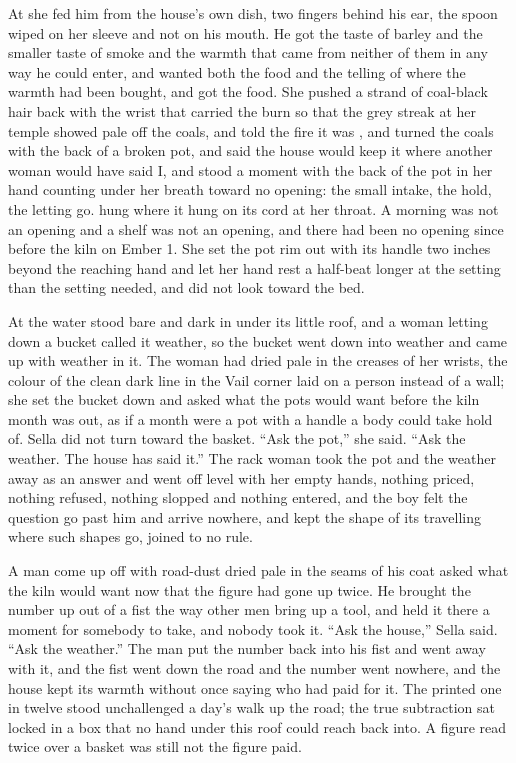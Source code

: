 At  she fed him from the house's own dish, two fingers behind his ear, the spoon wiped on her sleeve and not on his mouth. He got the taste of barley and the smaller taste of smoke and the warmth that came from neither of them in any way he could enter, and wanted both the food and the telling of where the warmth had been bought, and got the food. She pushed a strand of coal-black hair back with the wrist that carried the burn so that the grey streak at her temple showed pale off the coals, and told the fire it was , and turned the coals with the back of a broken pot, and said the house would keep it where another woman would have said I, and stood a moment with the back of the pot in her hand counting under her breath toward no opening: the small intake, the hold, the letting go.  hung where it hung on its cord at her throat. A morning was not an opening and a shelf was not an opening, and there had been no opening since before the kiln on Ember 1. She set the pot rim out with its handle two inches beyond the reaching hand and let her hand rest a half-beat longer at the setting than the setting needed, and did not look toward the bed.

\scenebreak

At  the water stood bare and dark in  under its little roof, and a woman letting down a bucket called it weather, so the bucket went down into weather and came up with weather in it. The woman had  dried pale in the creases of her wrists, the colour of the clean dark line in the Vail corner laid on a person instead of a wall; she set the bucket down and asked what the pots would want before the kiln month was out, as if a month were a pot with a handle a body could take hold of. Sella did not turn toward the basket. “Ask the pot,” she said. “Ask the weather. The house has said it.” The rack woman took the pot and the weather away as an answer and went off level with her empty hands, nothing priced, nothing refused, nothing slopped and nothing entered, and the boy felt the question go past him and arrive nowhere, and kept the shape of its travelling where such shapes go, joined to no rule.

A man come up off  with road-dust dried pale in the seams of his coat asked what the kiln would want now that the figure had gone up twice. He brought the number up out of a fist the way other men bring up a tool, and held it there a moment for somebody to take, and nobody took it. “Ask the house,” Sella said. “Ask the weather.” The man put the number back into his fist and went away with it, and the fist went down the road and the number went nowhere, and the house kept its warmth without once saying who had paid for it. The printed one in twelve stood unchallenged a day's walk up the road; the true subtraction sat locked in a box that no hand under this roof could reach back into. A figure read twice over a basket was still not the figure paid.

